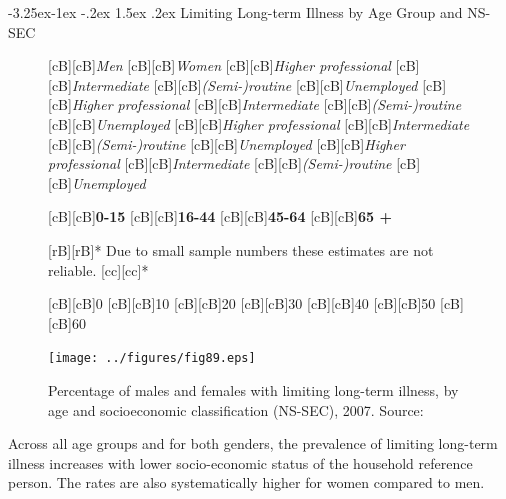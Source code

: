 \documentclass[11 pt, a4paper]{report}
\makeatletter
\renewcommand\subsection{\@startsection{subsection}{2}{\z@}%
                                     {-3.25ex\@plus -1ex \@minus -.2ex}%
                                     {1.5ex \@plus .2ex}%
    								{\large\scshape}}
\makeatother
\begin{document}
\clearpage
\subsection{Limiting Long-term Illness by Age Group and NS-SEC}
%
\begin{figure}[hbtp!]

[cB][cB]{\emph{Men}}
[cB][cB]{\emph{Women}}
[cB][cB]{\scriptsize{\emph{Higher professional}}}
[cB][cB]{\scriptsize{\emph{Intermediate}}}
[cB][cB]{\scriptsize{\emph{(Semi-)routine}}}
[cB][cB]{\scriptsize{\emph{Unemployed}}}
[cB][cB]{\scriptsize{\emph{Higher professional}}}
[cB][cB]{\scriptsize{\emph{Intermediate}}}
[cB][cB]{\scriptsize{\emph{(Semi-)routine}}}
[cB][cB]{\scriptsize{\emph{Unemployed}}}
[cB][cB]{\scriptsize{\emph{Higher professional}}}
[cB][cB]{\scriptsize{\emph{Intermediate}}}
[cB][cB]{\scriptsize{\emph{(Semi-)routine}}}
[cB][cB]{\scriptsize{\emph{Unemployed}}}
[cB][cB]{\scriptsize{\emph{Higher professional}}}
[cB][cB]{\scriptsize{\emph{Intermediate}}}
[cB][cB]{\scriptsize{\emph{(Semi-)routine}}}
[cB][cB]{\scriptsize{\emph{Unemployed}}}

[cB][cB]{\scriptsize{\textbf{0-15}}}
[cB][cB]{\scriptsize{\textbf{16-44}}}
[cB][cB]{\scriptsize{\textbf{45-64}}}
[cB][cB]{\scriptsize{\textbf{65 +}}}

[rB][rB]{\tiny{* Due to small sample numbers these estimates are not reliable.}}
[cc][cc]{\tiny{*}}

[cB][cB]{\small{0}}
[cB][cB]{\small{10}}
[cB][cB]{\small{20}}
[cB][cB]{\small{30}}
[cB][cB]{\small{40}}
[cB][cB]{\small{50}}
[cB][cB]{\small{60}}

\texttt{[image: ../figures/fig89.eps]}

\caption{Percentage of males and females with limiting long-term illness, by age and socioeconomic classification (NS-SEC), 2007. Source: \citet{ONS2013a}
}\label{Fig:N07} %
\end{figure}

Across all age groups and for both genders, the prevalence of limiting long-term illness increases with lower socio-economic status of the household reference person. The rates are also systematically higher for women compared to men.  
\end{document}
